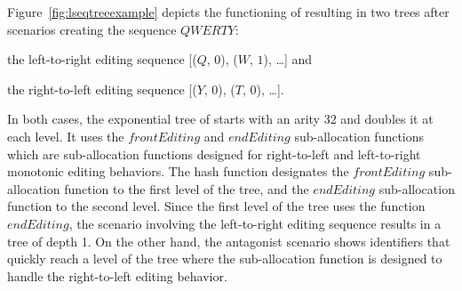 
\begin{figure*}
  \centering
  \subfloat {}
  \hspace{10pt}
  \subfloat {}
  \caption{\label{fig:lseqtreeexample}\LSEQ tree handling two monotonic
    editing behaviors.}
\end{figure*}


\begin{asparadesc}
\item [As summary,] Figure~\ref{fig:lseqtreeexample} depicts the functioning of
  \LSEQ resulting in two trees after scenarios creating the sequence $QWERTY$:
  \begin{inparaenum}[(i)] 
  \item the left-to-right editing sequence [($Q,\,0$), ($W,\,1$), \ldots] and
  \item the right-to-left editing sequence [($Y,\,0$), ($T,\,0$), \ldots].
  \end{inparaenum}
  In both cases, the exponential tree of \LSEQ starts with an arity $32$ and
  doubles it at each level. It uses the $frontEditing$ and $endEditing$
  sub-allocation functions which are sub-allocation functions designed for
  right-to-left and left-to-right monotonic editing behaviors. The hash function
  designates the $frontEditing$ sub-allocation function to the first level of
  the tree, and the $endEditing$ sub-allocation function to the second
  level. Since the first level of the tree uses the function $endEditing$, the
  scenario involving the left-to-right editing sequence results in a tree of
  depth 1. On the other hand, the antagonist scenario shows \LSEQ identifiers
  that quickly reach a level of the tree where the sub-allocation function is
  designed to handle the right-to-left editing behavior.
\end{asparadesc}


